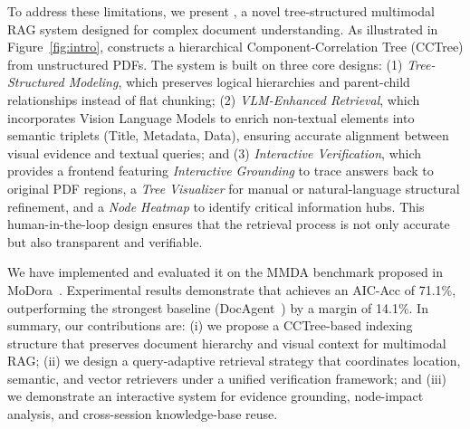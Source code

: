  To address these limitations, we present \modora, a novel tree-structured multimodal RAG system designed for complex document understanding. As illustrated in Figure~\ref{fig:intro}, \modora constructs a hierarchical Component-\-Correlation Tree (CCTree) from unstructured PDFs. 
The system is built on three core designs: 
(1) \textit{Tree-Structured Modeling}, which preserves logical hierarchies and parent-child relationships instead of flat chunking; 
(2) \textit{VLM-Enhanced Retrieval}, which incorporates Vision Language Models to enrich non-textual elements into semantic triplets (Title, Metadata, Data), ensuring accurate alignment between visual evidence and textual queries; 
and (3) \textit{Interactive Verification}, which provides a frontend featuring \textit{Interactive Grounding} to trace answers back to original PDF regions, a \textit{Tree Visualizer} for manual or natural-language structural refinement, and a \textit{Node Heatmap} to identify critical information hubs. 
This human-in-the-loop design ensures that the retrieval process is not only accurate but also transparent and verifiable.

 We have implemented \modora and evaluated it on the MMDA benchmark proposed in MoDora~\cite{xu2026modora}. Experimental results demonstrate that \modora achieves an AIC-Acc of 71.1\%, outperforming the strongest baseline (DocAgent~\cite{DocAgent}) by a margin of 14.1\%. 
In summary, our contributions are: 
(i) we propose a CCTree-based indexing structure that preserves document hierarchy and visual context for multimodal RAG; 
(ii) we design a query-adaptive retrieval strategy that coordinates location, semantic, and vector retrievers under a unified verification framework; 
and (iii) we demonstrate an interactive system for evidence grounding, node-impact analysis, and cross-session knowledge-base reuse.
